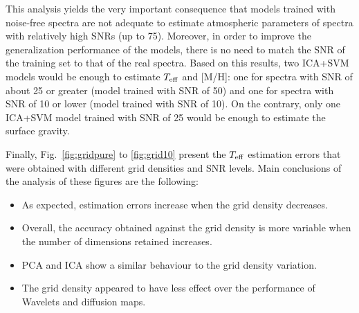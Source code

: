 \documentclass[a4paper,fleqn,usenatbib]{mnras}
\begin{document}
{{{This analysis yields the very important consequence that models
trained with noise-free spectra are not adequate to estimate
atmospheric parameters of spectra with relatively high SNRs (up to
75). Moreover, in order to improve the generalization performance of
the models, there is no need to match the SNR of the training set to
that of the real spectra. Based on this results, two ICA+SVM models
would be enough to estimate $T_{\rm eff}$ and [M/H]: one for spectra
with SNR of about 25 or greater (model trained with SNR of 50) and one
for spectra with SNR of 10 or lower (model trained with SNR of 10).
On the contrary, only one ICA+SVM model trained with SNR of 25 would
be enough to estimate the surface gravity.

Finally, Fig.~\ref{fig:gridpure} to \ref{fig:grid10} present the
$T_{\rm eff}$ estimation errors that were obtained with different 
grid densities and SNR levels. Main conclusions of the analysis 
of these figures are the following:

\begin{itemize}
\item As expected, estimation errors increase when the grid 
	density decreases.
\item Overall, the accuracy obtained against the grid density 
	is more variable when the number of dimensions retained 
	increases. 
\item PCA and ICA show a similar behaviour to the grid density 
	variation. 
\item The grid density appeared to have less effect over the 
	performance of Wavelets and diffusion maps.
\end{itemize}




}}}
\end{document}
